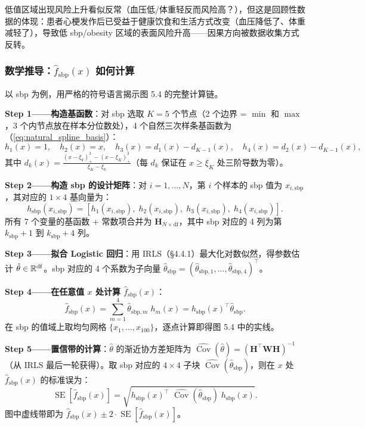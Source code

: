 低值区域出现风险上升看似反常（血压低/体重轻反而风险高？），但这是回顾性数据的体现：患者心梗发作后已受益于健康饮食和生活方式改变（血压降低了、体重减轻了），导致低 sbp/obesity 区域的表面风险升高——因果方向被数据收集方式反转。

\subsubsection{数学推导：$\hat{f}_{\mathrm{sbp}}(x)$ 如何计算}

以 sbp 为例，用严格的符号语言揭示图 5.4 的完整计算链。

\textbf{Step 1——构造基函数}：对 sbp 选取 $K=5$ 个节点（2 个边界 = $\min$ 和 $\max$，3 个内节点放在样本分位数处），4 个自然三次样条基函数为（\eqref{eq:natural_spline_basis}）：
\[
h_1(x)=1,\quad h_2(x)=x,\quad h_3(x)=d_1(x)-d_{K-1}(x),\quad h_4(x)=d_2(x)-d_{K-1}(x),
\]
其中 $d_k(x)=\frac{(x-\xi_k)_+^3-(x-\xi_K)_+^3}{\xi_K-\xi_k}$（每 $d_k$ 保证在 $x\ge\xi_K$ 处三阶导数为零）。

\textbf{Step 2——构造 sbp 的设计矩阵}：对 $i=1,\ldots,N$，第 $i$ 个样本的 sbp 值为 $x_{i,\mathrm{sbp}}$，其对应的 $1\times 4$ 基向量为：
\[
h_{\mathrm{sbp}}(x_{i,\mathrm{sbp}}) = [h_1(x_{i,\mathrm{sbp}}),\; h_2(x_{i,\mathrm{sbp}}),\; h_3(x_{i,\mathrm{sbp}}),\; h_4(x_{i,\mathrm{sbp}})].
\]
所有 7 个变量的基函数 + 常数项合并为 $\mathbf{H}_{N\times\mathrm{df}}$，其中 sbp 对应的 4 列为第 $k_{\mathrm{sbp}}+1$ 到 $k_{\mathrm{sbp}}+4$ 列。

\textbf{Step 3——拟合 Logistic 回归}：用 IRLS（§4.4.1）最大化对数似然，得参数估计 $\hat{\theta}\in\mathbb{R}^{\mathrm{df}}$。sbp 对应的 4 个系数为子向量 $\hat{\theta}_{\mathrm{sbp}} = (\hat{\theta}_{\mathrm{sbp},1}, \ldots, \hat{\theta}_{\mathrm{sbp},4})^\top$。

\textbf{Step 4——在任意值 $x$ 处计算 $\hat{f}_{\mathrm{sbp}}(x)$}：
\[
\boxed{\hat{f}_{\mathrm{sbp}}(x) = \sum_{m=1}^{4} \hat{\theta}_{\mathrm{sbp},m}\; h_m(x)
    = h_{\mathrm{sbp}}(x)^\top \hat{\theta}_{\mathrm{sbp}}.}
\]
在 sbp 的值域上取均匀网格 $\{x_1,\ldots,x_{100}\}$，逐点计算即得图 5.4 中的实线。

\textbf{Step 5——置信带的计算}：$\hat{\theta}$ 的渐近协方差矩阵为 $\widehat{\operatorname{Cov}}(\hat{\theta}) = (\mathbf{H}^\top\mathbf{W}\mathbf{H})^{-1}$（从 IRLS 最后一轮获得）。取 sbp 对应的 $4\times 4$ 子块 $\widehat{\operatorname{Cov}}(\hat{\theta}_{\mathrm{sbp}})$，则在 $x$ 处 $\hat{f}_{\mathrm{sbp}}(x)$ 的标准误为：
\[
\operatorname{SE}[\hat{f}_{\mathrm{sbp}}(x)] = \sqrt{h_{\mathrm{sbp}}(x)^\top\; \widehat{\operatorname{Cov}}(\hat{\theta}_{\mathrm{sbp}})\; h_{\mathrm{sbp}}(x)}.
\]
图中虚线带即为 $\hat{f}_{\mathrm{sbp}}(x) \pm 2\cdot\operatorname{SE}[\hat{f}_{\mathrm{sbp}}(x)]$。

